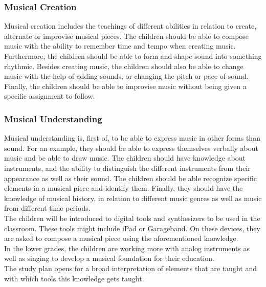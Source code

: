 \subsubsection*{Musical Creation}
Musical creation includes the teachings of different abilities in relation to create, alternate or improvise musical pieces. The children should be able to compose music with the ability to remember time and tempo when creating music. Furthermore, the children should be able to form and shape sound into something rhythmic. Besides creating music, the children should also be able to change music with the help of adding sounds, or changing the pitch or pace of sound. Finally, the children should be able to improvise music without being given a specific assignment to follow.

\subsubsection*{Musical Understanding}
Musical understanding is, first of, to be able to express music in other forms than sound. For an example, they should be able to express themselves verbally about music and be able to draw music. The children should have knowledge about instruments, and the ability to distinguish the different instruments from their appearance as well as their sound. The children should be able recognize specific elements in a musical piece and identify them. Finally, they should have the knowledge of musical history, in relation to different music genres as well as music from different time periods.
\\

The children will be introduced to digital tools and synthesizers to be used in the classroom. These tools might include iPad or Garageband. On these devices, they are asked to compose a musical piece using the aforementioned knowledge.\\
In the lower grades, the children are working more with analog instruments as well as singing to develop a musical foundation for their education.
\\

The study plan opens for a broad interpretation of elements that are taught and with which tools this knowledge gets taught.\\	



